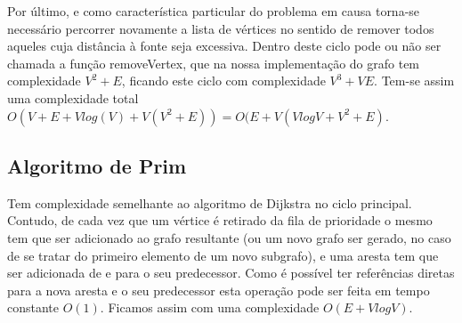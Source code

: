 \documentclass[a4paper,12pt,titlepage]{article}
\begin{document}
Por último, e como característica particular do problema em causa torna-se necessário percorrer novamente a lista de vértices no sentido de remover todos aqueles cuja distância à fonte seja excessiva. Dentro deste ciclo pode ou não ser chamada a função removeVertex, que na nossa implementação do grafo tem complexidade $V^2+ E$, ficando este ciclo com complexidade $V^3+VE$. Tem-se assim uma complexidade total $O(V+E+Vlog(V)+V(V^2+E)) = O(E+V(VlogV+V^2+E)$.
\subsection{Algoritmo de Prim}
Tem complexidade semelhante ao algoritmo de Dijkstra no ciclo principal. Contudo, de cada vez que um vértice é retirado da fila de prioridade o mesmo tem que ser adicionado ao grafo resultante (ou um novo grafo ser gerado, no caso de se tratar do primeiro elemento de um novo subgrafo), e uma aresta tem que ser adicionada de e para o seu predecessor. Como é possível ter referências diretas para a nova aresta e o seu predecessor esta operação pode ser feita em tempo constante $O(1)$. Ficamos assim com uma complexidade $O(E+VlogV)$.

\newpage


\end{document}
